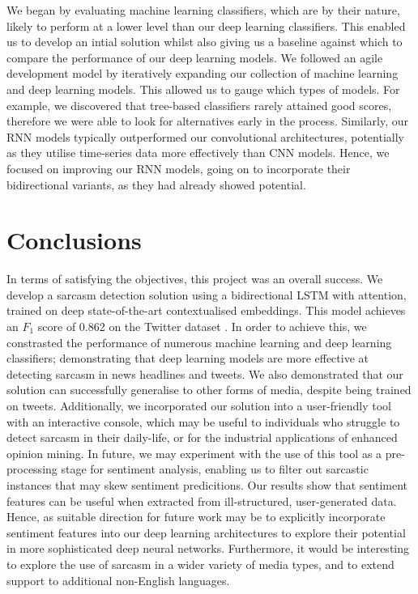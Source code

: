 \documentclass[12pt,a4paper]{article}
\begin{document}
\noindent We began by evaluating machine learning classifiers, which are by their nature, likely to perform at a lower level than our deep learning classifiers. This enabled us to develop an intial solution whilst also giving us a baseline against which to compare the performance of our deep learning models. We followed an agile development model by iteratively expanding our collection of machine learning and deep learning models. This allowed us to gauge which types of models. For example, we discovered that tree-based classifiers rarely attained good scores, therefore we were able to look for alternatives early in the process. Similarly, our RNN models typically outperformed our convolutional architectures, potentially as they utilise time-series data more effectively than CNN models. Hence, we focused on improving our RNN models, going on to incorporate their bidirectional variants, as they had already showed potential.


\section{Conclusions}\vspace{-4.2pt}
\noindent In terms of satisfying the objectives, this project was an overall success. We develop a sarcasm detection solution using a bidirectional LSTM with attention, trained on deep state-of-the-art contextualised embeddings. This model achieves an $F_1$ score of 0.862 on the Twitter dataset \cite{ptavcek2014sarcasm}. In order to achieve this, we constrasted the performance of numerous machine learning and deep learning classifiers; demonstrating that deep learning models are more effective at detecting sarcasm in news headlines and tweets. We also demonstrated that our solution can successfully generalise to other forms of media, despite being trained on tweets. Additionally, we incorporated our solution into a user-friendly tool with an interactive console, which may be useful to individuals who struggle to detect sarcasm in their daily-life, or for the industrial applications of enhanced opinion mining. In future, we may experiment with the use of this tool as a pre-processing stage for sentiment analysis, enabling us to filter out sarcastic instances that may skew sentiment predicitions. Our results show that sentiment features can be useful when extracted from ill-structured, user-generated data. Hence, as suitable direction for future work may be to explicitly incorporate sentiment features into our deep learning architectures to explore their potential in more sophisticated deep neural networks. Furthermore, it would be interesting to explore the use of sarcasm in a wider variety of media types, and to extend support to additional non-English languages. \\
\end{document}
